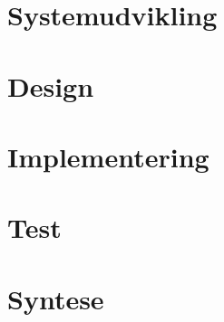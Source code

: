 \chapter{Systemudvikling}

\chapter{Design}









\chapter{Implementering}

\chapter{Test}

\chapter{Syntese}
%
%
%
\begingroup
\raggedright



%
%

\endgroup

\appendix


